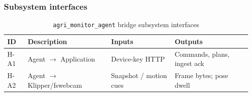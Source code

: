 \subsubsection{Subsystem interfaces}
\begin{table}[H]
\centering
\small
\begin{tabular}{|p{0.9cm}|p{3.4cm}|p{3.0cm}|p{3.5cm}|}
\hline
\textbf{ID} & \textbf{Description} & \textbf{Inputs} & \textbf{Outputs} \\
\hline
H-A1 & Agent $\rightarrow$ Application & Device-key HTTP & Commands, plans, ingest ack \\
\hline
H-A2 & Agent $\rightarrow$ Klipper/fswebcam & Snapshot / motion cues & Frame bytes; pose dwell \\
\hline
\end{tabular}
\caption{\texttt{agri\_monitor\_agent} bridge subsystem interfaces}
\end{table}
